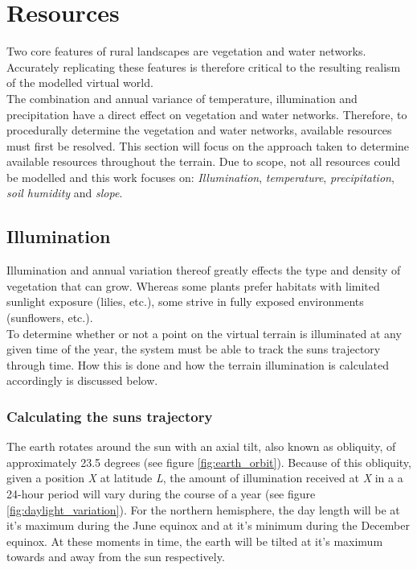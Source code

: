 \section{Resources}

Two core features of rural landscapes are vegetation and water networks. Accurately replicating these features is therefore critical to the resulting realism of the modelled virtual world.\\
The combination and annual variance of temperature, illumination and precipitation have a direct effect on vegetation and water networks. Therefore, to procedurally determine the vegetation and water networks, available resources must first be resolved. This section will focus on the approach taken to determine available resources throughout the terrain. Due to scope, not all resources could be modelled and this work focuses on: \textit{Illumination}, \textit{temperature}, \textit{precipitation}, \textit{soil humidity} and \textit{slope}. 

\subsection{Illumination}

Illumination and annual variation thereof greatly effects the type and density of vegetation that can grow. Whereas some plants prefer habitats with limited sunlight exposure (lilies, etc.), some strive in fully exposed environments (sunflowers, etc.). \\
To determine whether or not a point on the virtual terrain is illuminated at any given time of the year, the system must be able to track the suns trajectory through time. How this is done and how the terrain illumination is calculated accordingly is discussed below.

\subsubsection{Calculating the suns trajectory}

The earth rotates around the sun with an axial tilt, also known as obliquity, of approximately 23.5 degrees (see figure \ref{fig:earth_orbit}). Because of this obliquity, given a position \textit{X} at latitude \textit{L}, the amount of illumination received at \textit{X} in a a 24-hour period will vary during the course of a year (see figure \ref{fig:daylight_variation}). For the northern hemisphere, the day length will be at it's maximum during the June equinox and at it's minimum during the December equinox. At these moments in time, the earth will be tilted at it's maximum towards and away from the sun respectively.\\

